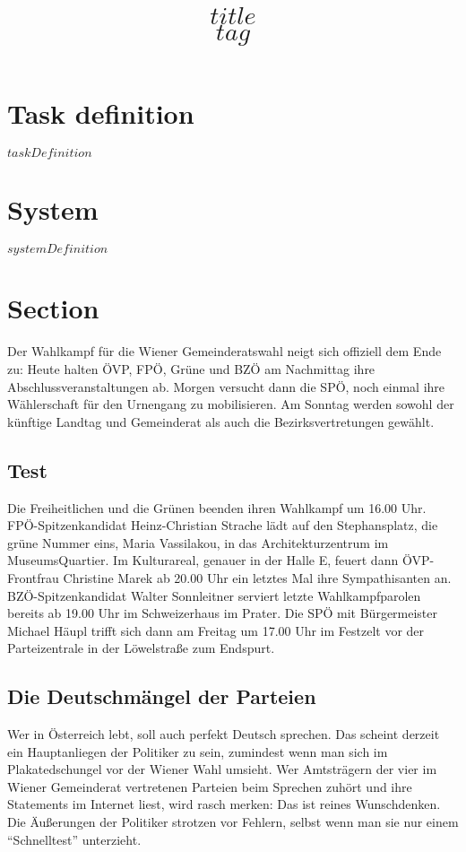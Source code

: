 \documentclass[a4paper,10pt,bibtotoc]{scrartcl}
\title{$title$\\$tag$}
\begin{document}

\maketitle

\begin{multicols}{2}

\tableofcontents


\section{Task definition}
$taskDefinition$

\section{System}
$systemDefinition$


\section{Section}
Der Wahlkampf für die Wiener Gemeinderatswahl neigt sich offiziell dem Ende zu: Heute halten ÖVP, FPÖ, Grüne und BZÖ am Nachmittag ihre Abschlussveranstaltungen ab. Morgen versucht dann die SPÖ, noch einmal ihre Wählerschaft für den Urnengang zu mobilisieren. Am Sonntag werden sowohl der künftige Landtag und Gemeinderat als auch die Bezirksvertretungen gewählt.

\subsection{Test}

Die Freiheitlichen und die Grünen beenden ihren Wahlkampf um 16.00 Uhr. FPÖ-Spitzenkandidat Heinz-Christian Strache lädt auf den Stephansplatz, die grüne Nummer eins, Maria Vassilakou, in das Architekturzentrum im MuseumsQuartier. Im Kulturareal, genauer in der Halle E, feuert dann ÖVP-Frontfrau Christine Marek ab 20.00 Uhr ein letztes Mal ihre Sympathisanten an. BZÖ-Spitzenkandidat Walter Sonnleitner serviert letzte Wahlkampfparolen bereits ab 19.00 Uhr im Schweizerhaus im Prater. Die SPÖ mit Bürgermeister Michael Häupl trifft sich dann am Freitag um 17.00 Uhr im Festzelt vor der Parteizentrale in der Löwelstraße zum Endspurt.

\subsection{Die Deutschmängel der Parteien}
Wer in Österreich lebt, soll auch perfekt Deutsch sprechen. Das scheint derzeit ein Hauptanliegen der Politiker zu sein, zumindest wenn man sich im Plakatedschungel vor der Wiener Wahl umsieht. Wer Amtsträgern der vier im Wiener Gemeinderat vertretenen Parteien beim Sprechen zuhört und ihre Statements im Internet liest, wird rasch merken: Das ist reines Wunschdenken. Die Äußerungen der Politiker strotzen vor Fehlern, selbst wenn man sie nur einem ``Schnelltest'' unterzieht.

% 
% 

\end{multicols}
\end{document}
